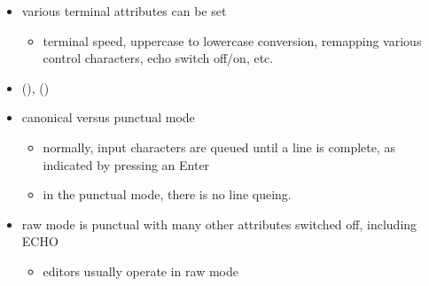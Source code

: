 \begin{itemize}
\item various terminal attributes can be set
	\begin{itemize}
	\item terminal speed, uppercase to lowercase conversion, remapping
	various control characters, echo switch off/on, etc.
	\end{itemize}
\item {}(), ()
\item canonical versus punctual mode
	\begin{itemize}
	\item normally, input characters are queued until a line is complete, as
	indicated by pressing an Enter
	\item in the punctual mode, there is no line queing.
	\end{itemize}
\item raw mode is punctual with many other attributes switched off, including
ECHO
	\begin{itemize}
  	\item editors usually operate in raw mode
	\end{itemize}
\end{itemize}

\label{CANONICAL}
\label{TERMIOS}

